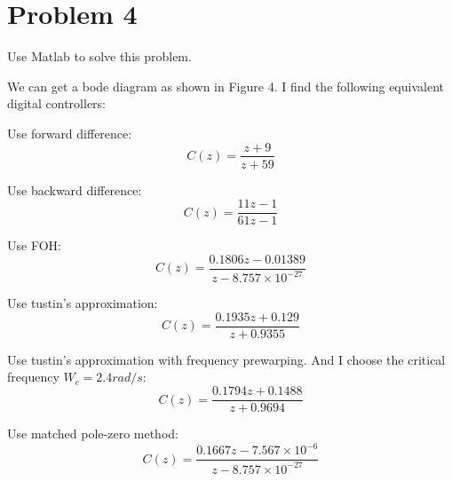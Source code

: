 ﻿\documentclass{myart}
\begin{document}
\newpage
\section{Problem 4}
Use Matlab to solve this problem.

\qquad We can get a bode diagram as shown in Figure 4.
\newpage
I find the following equivalent digital controllers:

Use forward difference:
\begin{equation}
C(z)=\frac{z+9}{z+59}
\end{equation}

Use backward difference:
\begin{equation}
C(z)=\frac{11z-1}{61z-1}
\end{equation}

Use FOH:
\begin{equation}
C(z)=\frac{0.1806z-0.01389}{z-8.757\times 10^{-27}}
\end{equation}

Use tustin's approximation:
\begin{equation}
C(z)=\frac{0.1935z+0.129}{z+0.9355}
\end{equation}

Use tustin's approximation with frequency prewarping. And I choose the critical frequency $W_c = 2.4 rad/s $:
\begin{equation}
C(z)=\frac{0.1794z+0.1488}{z+0.9694}
\end{equation}

Use matched pole-zero method:
\begin{equation}
C(z)=\frac{0.1667z-7.567\times 10^{-6}}{z-8.757\times 10^{-27}}
\end{equation}
\end{document}
